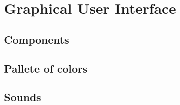 \section{Graphical User Interface}

\subsection{Components}

\subsection{Pallete of colors}

\subsection{Sounds}
